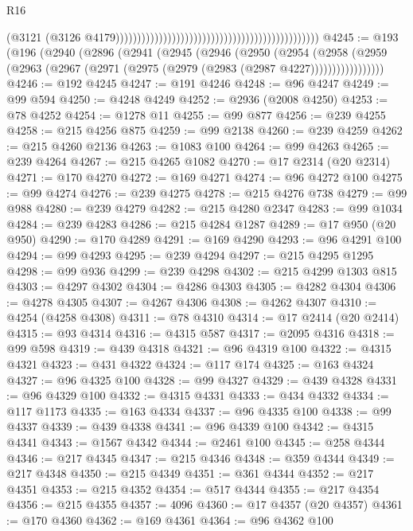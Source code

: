 \begin{lexlean}{R16}
\begin{coremodule}
                                                                                              (@3121
                                                                                                (@3126
                                                                                                  @4179)))))))))))))))))))))))))))))))))))))))))))))))
@4245 := @193
    (@196
      (@2940
        (@2896
          (@2941
            (@2945
              (@2946
                (@2950
                  (@2954
                    (@2958
                      (@2959 (@2963 (@2967 (@2971 (@2975 (@2979 (@2983 (@2987 @4227)))))))))))))))))
@4246 := @192 @4245
@4247 := @191 @4246
@4248 := @96 @4247
@4249 := @99 @594
@4250 := @4248 @4249
@4252 := @2936 (@2008 @4250)
@4253 := @78 @4252
@4254 := @1278 @11
@4255 := @99 @877
@4256 := @239 @4255
@4258 := @215 @4256 @875
@4259 := @99 @2138
@4260 := @239 @4259
@4262 := @215 @4260 @2136
@4263 := @1083 @100
@4264 := @99 @4263
@4265 := @239 @4264
@4267 := @215 @4265 @1082
@4270 := @17 @2314 (@20 @2314)
@4271 := @170 @4270
@4272 := @169 @4271
@4274 := @96 @4272 @100
@4275 := @99 @4274
@4276 := @239 @4275
@4278 := @215 @4276 @738
@4279 := @99 @988
@4280 := @239 @4279
@4282 := @215 @4280 @2347
@4283 := @99 @1034
@4284 := @239 @4283
@4286 := @215 @4284 @1287
@4289 := @17 @950 (@20 @950)
@4290 := @170 @4289
@4291 := @169 @4290
@4293 := @96 @4291 @100
@4294 := @99 @4293
@4295 := @239 @4294
@4297 := @215 @4295 @1295
@4298 := @99 @936
@4299 := @239 @4298
@4302 := @215 @4299 @1303 @815
@4303 := @4297 @4302
@4304 := @4286 @4303
@4305 := @4282 @4304
@4306 := @4278 @4305
@4307 := @4267 @4306
@4308 := @4262 @4307
@4310 := @4254 (@4258 @4308)
@4311 := @78 @4310
@4314 := @17 @2414 (@20 @2414)
@4315 := @93 @4314
@4316 := @4315 @587
@4317 := @2095 @4316
@4318 := @99 @598
@4319 := @439 @4318
@4321 := @96 @4319 @100
@4322 := @4315 @4321
@4323 := @431 @4322
@4324 := @117 @174
@4325 := @163 @4324
@4327 := @96 @4325 @100
@4328 := @99 @4327
@4329 := @439 @4328
@4331 := @96 @4329 @100
@4332 := @4315 @4331
@4333 := @434 @4332
@4334 := @117 @1173
@4335 := @163 @4334
@4337 := @96 @4335 @100
@4338 := @99 @4337
@4339 := @439 @4338
@4341 := @96 @4339 @100
@4342 := @4315 @4341
@4343 := @1567 @4342
@4344 := @2461 @100
@4345 := @258 @4344
@4346 := @217 @4345
@4347 := @215 @4346
@4348 := @359 @4344
@4349 := @217 @4348
@4350 := @215 @4349
@4351 := @361 @4344
@4352 := @217 @4351
@4353 := @215 @4352
@4354 := @517 @4344
@4355 := @217 @4354
@4356 := @215 @4355
@4357 := 4096
@4360 := @17 @4357 (@20 @4357)
@4361 := @170 @4360
@4362 := @169 @4361
@4364 := @96 @4362 @100

\end{coremodule}
\end{lexlean}
